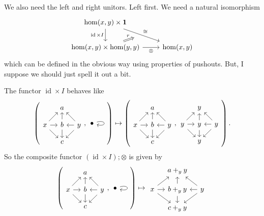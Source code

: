 \documentclass[12pt]{article}
\renewcommand{\(}{\left(}
\renewcommand{\)}{\right)}
\renewcommand{\{}{\left\lbrace}
\renewcommand{\}}{\right\rbrace}
\DeclareMathOperator{\id}{id}
\theoremstyle{remark}
\theoremstyle{definition}
\begin{document}
We also need the left and right unitors.  Left first.  We need a natural isomorphism 
\[
	\begin{tikzcd}
		{\hom (x,y) \times \mathbf{1}} 
			\ar[d, swap, "\id \times I"] 
			\ar[dr, "\cong"]&
		{} \\
		{\hom (x,y) \times \hom (y,y)} 
			\ar[r, swap, "\otimes"] 
			\ar[ru, Rightarrow,  shorten >=6em, "r", pos=.15] &
		{\hom (x,y)}
	\end{tikzcd}
\]
which can be defined in the obvious way using properties of pushouts.  But, I suppose we should just spell it out a bit.

The functor $\id \times I$ behaves like
\[
	\left(
	\begin{tikzcd}[column sep=1em,row sep=1em]
		{} &
		{a} &
		{} \\
		{x}
			\ar[ru] 
			\ar[r]
			\ar[rd] &
		{b} 
			\ar[u]
			\ar[d]&
		{y}
			\ar[lu]
			\ar[l]
			\ar[ld]\\
		{} &
		{c} &
		{} 
	\end{tikzcd},
	\begin{tikzcd}
		{\bullet} \ar[loop right]
	\end{tikzcd}
	\right) 
	\mapsto
	\left(
	\begin{tikzcd}[column sep=1em,row sep=1em]
		{} &
		{a} &
		{} \\
		{x}
			\ar[ru] 
			\ar[r]
			\ar[rd] &
		{b} 
			\ar[u]
			\ar[d]&
		{y}
			\ar[lu]
			\ar[l]
			\ar[ld]\\
		{} &
		{c} &
		{} 
	\end{tikzcd},
	\begin{tikzcd}[column sep=1em,row sep=1em]
		{} &
		{y} &
		{} \\
		{y}
			\ar[ru] 
			\ar[r]
			\ar[rd] &
		{y} 
			\ar[u]
			\ar[d]&
		{y}
			\ar[lu]
			\ar[l]
			\ar[ld]\\
		{} &
		{y} &
		{} 
	\end{tikzcd}
	\right).
\]
So the composite functor $(\id \times I); \otimes$ is given by 
\[
	\left(
	\begin{tikzcd}[column sep=1em,row sep=1em]
		{} &
		{a} &
		{} \\
		{x}
			\ar[ru] 
			\ar[r]
			\ar[rd] &
		{b} 
			\ar[u]
			\ar[d]&
		{y}
			\ar[lu]
			\ar[l]
			\ar[ld]\\
		{} &
		{c} &
		{} 
	\end{tikzcd},
	\begin{tikzcd}
		{\bullet} \ar[loop right]
	\end{tikzcd}
	\right) 
	\mapsto
	\begin{tikzcd}[column sep=1em,row sep=1em]
		{} &
		{a +_y y} &
		{} \\
		{x}
			\ar[ru] 
			\ar[r]
			\ar[rd] &
		{b +_y y} 
			\ar[u]
			\ar[d]&
		{y}
			\ar[lu]
			\ar[l]
			\ar[ld]\\
		{} &
		{c +_y y} &
		{} 
	\end{tikzcd}
\]
\end{document}
